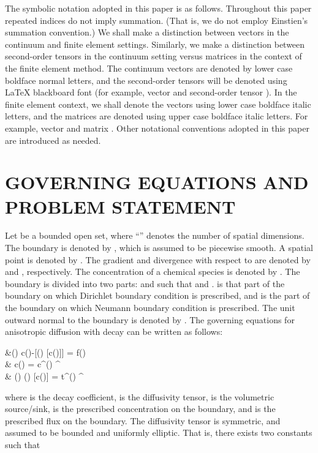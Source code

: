 \documentclass[11pt]{amsart}
\begin{document}
The symbolic notation adopted in this paper is as follows. Throughout this paper repeated 
indices do not imply summation. (That is, we do not employ Einstien's summation convention.) 
We shall make a distinction between vectors in the continuum and finite element settings. 
Similarly, we make a distinction between second-order tensors in the continuum setting 
versus matrices in the context of the finite element method. The continuum vectors are 
denoted by lower case boldface normal letters, and the second-order tensors will be denoted 
using \LaTeX{} blackboard font (for example, vector  and second-order tensor 
). In the finite element context, we shall denote the vectors using lower case 
boldface italic letters, and the matrices are denoted using upper case boldface italic 
letters. For example, vector  and matrix . Other notational 
conventions adopted in this paper are introduced as needed. 
 
\section{GOVERNING EQUATIONS AND PROBLEM STATEMENT}
\label{Sec:Decay_Governing_equations}
Let  be a bounded open set, where ``'' denotes the number 
of spatial dimensions.  The boundary is denoted by , which is assumed to be 
piecewise smooth. A spatial point is denoted by . The gradient and 
divergence with respect to  are denoted by  and , respectively. The concentration of a chemical species is denoted by . 
The boundary is divided into two parts:  and  such that 
 and .  is that part of the boundary on which 
Dirichlet boundary condition is prescribed, and  is the part of the 
boundary on which Neumann boundary condition is prescribed. The unit outward normal to 
the boundary is denoted by . 
The governing equations for anisotropic diffusion with decay can be written as follows:

    \label{Eqn:Decay_diffusion}
    &\alpha() c()-[() 
    [c()]] = f() \quad {} \; \Omega  \\
& c() = c^{}() \quad {} \; 
    \Gamma^{} \\
& () \cdot {}() [c()] 
    = t^{}() \quad {} \; \Gamma^{} 
  
where  is the decay coefficient,  is the diffusivity 
tensor,  is the volumetric source/sink,  is the prescribed 
concentration on the boundary, and  is the prescribed flux on the boundary. 
The diffusivity tensor is symmetric, and assumed to be bounded and uniformly elliptic. That is, there 
exists two constants  such that 
\end{document}
